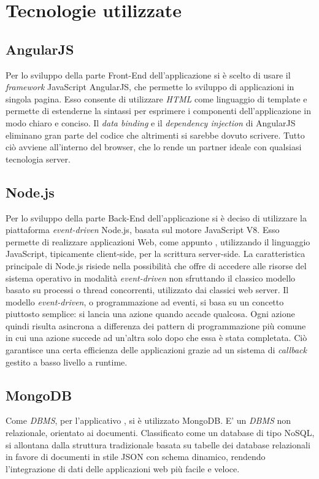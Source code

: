 \newpage
\section{Tecnologie utilizzate}
\subsection{AngularJS}
Per lo sviluppo della parte Front-End dell'applicazione si è scelto di usare il \textit{framework} JavaScript AngularJS, che permette lo sviluppo di applicazioni in singola pagina. Esso consente di utilizzare \textit{HTML} come linguaggio di template e permette di estenderne la sintassi per esprimere i componenti dell'applicazione in modo chiaro e conciso. Il \textit{data binding} e il \textit{dependency injection} di AngularJS eliminano gran parte del codice che altrimenti si sarebbe dovuto scrivere. Tutto ciò avviene all'interno del browser, che lo rende un partner ideale con qualsiasi tecnologia server.
\subsection{Node.js}
Per lo sviluppo della parte Back-End dell'applicazione si è deciso di utilizzare la piattaforma \textit{event-driven} Node.js, basata sul motore JavaScript V8. Esso permette di realizzare applicazioni Web, come appunto \progetto, utilizzando il linguaggio JavaScript, tipicamente client-side, per la scrittura server-side. La caratteristica principale di Node.js risiede nella possibilità che offre di accedere alle risorse del sistema operativo in modalità \textit{event-driven} non sfruttando il classico modello basato su processi o thread concorrenti, utilizzato dai classici web server. Il modello \textit{event-driven}, o programmazione ad eventi, si basa su un concetto piuttosto semplice: si lancia una azione quando accade qualcosa. Ogni azione quindi risulta asincrona a differenza dei pattern di programmazione più comune in cui una azione succede ad un’altra solo dopo che essa è stata completata. Ciò garantisce una certa efficienza delle applicazioni grazie ad un sistema di \textit{callback} gestito a basso livello a runtime.
\subsection{MongoDB}
Come \textit{DBMS}, per l'applicativo \progetto, si è utilizzato MongoDB. E' un \textit{DBMS} non relazionale, orientato ai documenti. Classificato come un database di tipo NoSQL, si allontana dalla struttura tradizionale basata su tabelle dei database relazionali in favore di documenti in stile JSON con schema dinamico, rendendo l'integrazione di dati delle applicazioni web più facile e veloce. 
